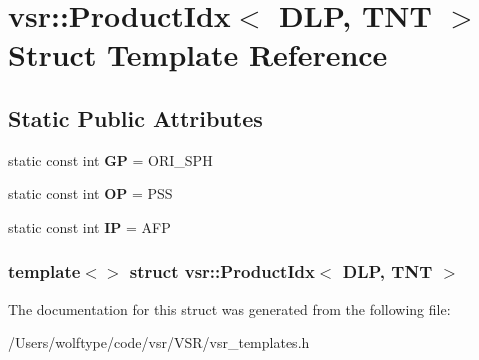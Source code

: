 \hypertarget{structvsr_1_1_product_idx_3_01_d_l_p_00_01_t_n_t_01_4}{\section{vsr\-:\-:Product\-Idx$<$ D\-L\-P, T\-N\-T $>$ Struct Template Reference}
\label{structvsr_1_1_product_idx_3_01_d_l_p_00_01_t_n_t_01_4}
}
\subsection*{Static Public Attributes}
\begin{DoxyCompactItemize}
\item 
\hypertarget{structvsr_1_1_product_idx_3_01_d_l_p_00_01_t_n_t_01_4_a617b3e487c8932443b405d954fcac4d6}{static const int {\bfseries G\-P} = O\-R\-I\-\_\-\-S\-P\-H}\label{structvsr_1_1_product_idx_3_01_d_l_p_00_01_t_n_t_01_4_a617b3e487c8932443b405d954fcac4d6}

\item 
\hypertarget{structvsr_1_1_product_idx_3_01_d_l_p_00_01_t_n_t_01_4_a4de56c48687ef09b06bf046e80549fdb}{static const int {\bfseries O\-P} = P\-S\-S}\label{structvsr_1_1_product_idx_3_01_d_l_p_00_01_t_n_t_01_4_a4de56c48687ef09b06bf046e80549fdb}

\item 
\hypertarget{structvsr_1_1_product_idx_3_01_d_l_p_00_01_t_n_t_01_4_adbf4718c00f721791c7b62bdc0b05dd0}{static const int {\bfseries I\-P} = A\-F\-P}\label{structvsr_1_1_product_idx_3_01_d_l_p_00_01_t_n_t_01_4_adbf4718c00f721791c7b62bdc0b05dd0}

\end{DoxyCompactItemize}
\subsubsection*{template$<$$>$ struct vsr\-::\-Product\-Idx$<$ D\-L\-P, T\-N\-T $>$}



The documentation for this struct was generated from the following file\-:\begin{DoxyCompactItemize}
\item 
/\-Users/wolftype/code/vsr/\-V\-S\-R/vsr\-\_\-templates.\-h\end{DoxyCompactItemize}
